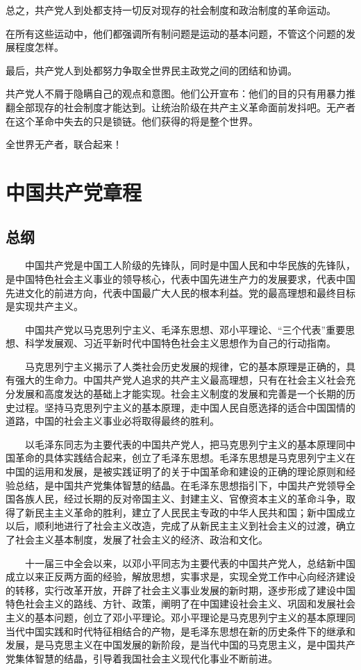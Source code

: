     总之，共产党人到处都支持一切反对现存的社会制度和政治制度的革命运动。

    在所有这些运动中，他们都强调所有制问题是运动的基本问题，不管这个问题的发展程度怎样。

    最后，共产党人到处都努力争取全世界民主政党之间的团结和协调。

    共产党人不屑于隐瞒自己的观点和意图。他们公开宣布：他们的目的只有用暴力推翻全部现存的社会制度才能达到。让统治阶级在共产主义革命面前发抖吧。无产者在这个革命中失去的只是锁链。他们获得的将是整个世界。

    全世界无产者，联合起来！
    \section{中国共产党章程}
    \subsection{总纲}
　　中国共产党是中国工人阶级的先锋队，同时是中国人民和中华民族的先锋队，是中国特色社会主义事业的领导核心，代表中国先进生产力的发展要求，代表中国先进文化的前进方向，代表中国最广大人民的根本利益。党的最高理想和最终目标是实现共产主义。

　　中国共产党以马克思列宁主义、毛泽东思想、邓小平理论、“三个代表”重要思想、科学发展观、习近平新时代中国特色社会主义思想作为自己的行动指南。

　　马克思列宁主义揭示了人类社会历史发展的规律，它的基本原理是正确的，具有强大的生命力。中国共产党人追求的共产主义最高理想，只有在社会主义社会充分发展和高度发达的基础上才能实现。社会主义制度的发展和完善是一个长期的历史过程。坚持马克思列宁主义的基本原理，走中国人民自愿选择的适合中国国情的道路，中国的社会主义事业必将取得最终的胜利。

　　以毛泽东同志为主要代表的中国共产党人，把马克思列宁主义的基本原理同中国革命的具体实践结合起来，创立了毛泽东思想。毛泽东思想是马克思列宁主义在中国的运用和发展，是被实践证明了的关于中国革命和建设的正确的理论原则和经验总结，是中国共产党集体智慧的结晶。在毛泽东思想指引下，中国共产党领导全国各族人民，经过长期的反对帝国主义、封建主义、官僚资本主义的革命斗争，取得了新民主主义革命的胜利，建立了人民民主专政的中华人民共和国；新中国成立以后，顺利地进行了社会主义改造，完成了从新民主主义到社会主义的过渡，确立了社会主义基本制度，发展了社会主义的经济、政治和文化。

　　十一届三中全会以来，以邓小平同志为主要代表的中国共产党人，总结新中国成立以来正反两方面的经验，解放思想，实事求是，实现全党工作中心向经济建设的转移，实行改革开放，开辟了社会主义事业发展的新时期，逐步形成了建设中国特色社会主义的路线、方针、政策，阐明了在中国建设社会主义、巩固和发展社会主义的基本问题，创立了邓小平理论。邓小平理论是马克思列宁主义的基本原理同当代中国实践和时代特征相结合的产物，是毛泽东思想在新的历史条件下的继承和发展，是马克思主义在中国发展的新阶段，是当代中国的马克思主义，是中国共产党集体智慧的结晶，引导着我国社会主义现代化事业不断前进。

